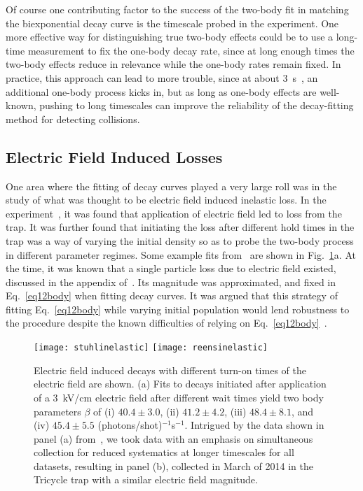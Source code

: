 Of course one contributing factor to the success of the two-body fit in matching the biexponential decay curve is the timescale probed in the experiment.
One more effective way for distinguishing true two-body effects could be to use a long-time measurement to fix the one-body decay rate, since at long enough times the two-body effects reduce in relevance while the one-body rates remain fixed.
In practice, this approach can lead to more trouble, since at about $3$~s~\cite{Hoekstra2007}, an additional one-body process kicks in, but as long as one-body effects are well-known, pushing to long timescales can improve the reliability of the decay-fitting method for detecting collisions.

\subsection{Electric Field Induced Losses}\label{sec:efil}

One area where the fitting of decay curves played a very large roll was in the study of what was thought to be electric field induced inelastic loss.
In the experiment~\cite{Stuhl2013}, it was found that application of electric field led to loss from the trap. 
It was further found that initiating the loss after different hold times in the trap was a way of varying the initial density so as to probe the two-body process in different parameter regimes.
Some example fits from~\cite{Stuhl2013} are shown in Fig.~\ref{efielddecay}a.
At the time, it was known that a single particle loss due to electric field existed, discussed in the appendix of~\cite{Stuhl2013}.
Its magnitude was approximated, and fixed in Eq.~\ref{eq12body} when fitting decay curves.
It was argued that this strategy of fitting Eq.~\ref{eq12body} while varying initial population would lend robustness to the procedure despite the known difficulties of relying on Eq.~\ref{eq12body}~\citep[Page.~1800, bottom right]{Stuhl2013}.

\begin{figure}[t!]
\centering
\vspace{0.5mm}
\texttt{[image: stuhlinelastic]}
\texttt{[image: reensinelastic]}
\caption[Electric Field Induced Decays]{
Electric field induced decays with different turn-on times of the electric field are shown.
(a) Fits to decays initiated after application of a $3$~kV/cm electric field after different wait times yield two body parameters $\beta$ of (i) $40.4\pm3.0$, (ii) $41.2\pm4.2$, (iii) $48.4\pm8.1$, and (iv) $45.4\pm5.5$ (photons/shot)$^{-1}$s$^{-1}$. 
Intrigued by the data shown in panel (a) from~\cite{Stuhl2013}, we took data with an emphasis on simultaneous collection for reduced systematics at longer timescales for all datasets, resulting in panel (b), collected in March of 2014 in the Tricycle trap with a similar electric field magnitude.
\label{efielddecay}}
\end{figure}

